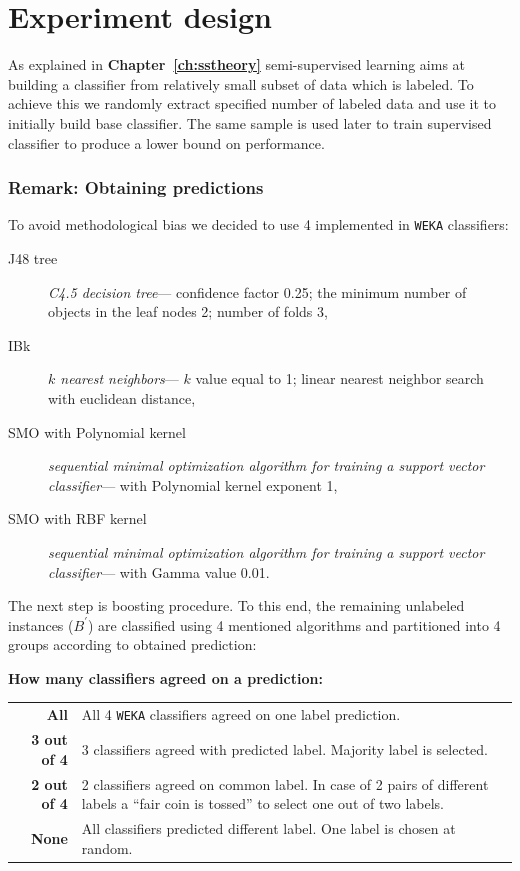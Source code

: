 \documentclass[12pt, a4paper, pdflatex]{report}
\begin{document}
\section{Experiment design}
As explained in \textbf{Chapter~\ref{ch:sstheory}} semi-supervised learning aims at building a classifier from relatively small subset of data which is labeled. To achieve this we randomly extract specified number of labeled data and use it to initially build base classifier. The same sample is used later to train supervised classifier to produce a lower bound on performance.

\subsubsection{Remark: Obtaining predictions}
To avoid methodological bias we decided to use 4 implemented in \texttt{WEKA} classifiers:
\begin{description}
\item[J48 tree] \emph{C4.5 decision tree}--- confidence factor 0.25; the minimum number of objects in the leaf nodes 2; number of folds 3,
\item[IBk] \emph{$k$ nearest neighbors}--- $k$ value equal to 1; linear nearest neighbor search with euclidean distance,
\item[SMO with Polynomial kernel] \emph{sequential minimal optimization algorithm for training a support vector classifier}--- with Polynomial kernel exponent 1,
\item[SMO with RBF kernel] \emph{sequential minimal optimization algorithm for training a support vector classifier}--- with Gamma value 0.01.
\end{description}

The next step is boosting procedure. To this end, the remaining unlabeled instances ($B^{\prime}$) are classified using 4 mentioned algorithms and partitioned into 4 groups according to obtained prediction:\\[-0.6cm]
\begin{center}\textbf{How many classifiers agreed on a prediction:}\end{center}
\begin{tabular}{rp{12cm}}
\textbf{All} & All 4 \texttt{WEKA} classifiers agreed on one label prediction.\\
\textbf{3 out of 4} & 3 classifiers agreed with predicted label. Majority label is selected.\\
\textbf{2 out of 4} & 2 classifiers agreed on common label. In case of 2 pairs of different labels a ``fair coin is tossed'' to select one out of two labels.\\
\textbf{None} & All classifiers predicted different label. One label is chosen at random.\\[0.4cm]
\end{tabular}
\end{document}
